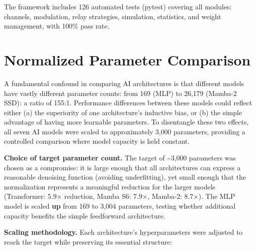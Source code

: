 The framework includes 126 automated tests (pytest) covering all modules: channels, modulation, relay strategies, simulation, statistics, and weight management, with 100\% pass rate.

\section{Normalized Parameter Comparison}\label{sec:normalized-parameter-comparison}

A fundamental confound in comparing AI architectures is that different models have vastly different parameter counts: from 169 (MLP) to 26,179 (Mamba-2 SSD): a ratio of 155:1. Performance differences between these models could reflect either (a) the superiority of one architecture's inductive bias, or (b) the simple advantage of having more learnable parameters. To disentangle these two effects, all seven AI models were scaled to approximately 3,000 parameters, providing a controlled comparison where model capacity is held constant.

\textbf{Choice of target parameter count.} The target of \textasciitilde3,000 parameters was chosen as a compromise: it is large enough that all architectures can express a reasonable denoising function (avoiding underfitting), yet small enough that the normalization represents a meaningful reduction for the larger models (Transformer: 5.9× reduction, Mamba S6: 7.9×, Mamba-2: 8.7×). The MLP model is scaled \textbf{up} from 169 to 3,004 parameters, testing whether additional capacity benefits the simple feedforward architecture.

\textbf{Scaling methodology.} Each architecture's hyperparameters were adjusted to reach the target while preserving its essential structure:

